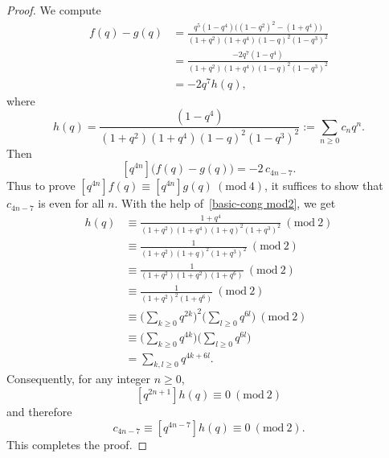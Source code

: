 \documentclass[10pt,a4paper]{amsart}
\newcommand{\Mod}[1]{\ (\mathrm{mod}\ #1)}
\newcommand{\fr}{\frac}
\begin{document}
\begin{proof}
We compute
\[
\begin{aligned}
f(q)-g(q)
&=\frac{q^5(1-q^4)\bigl((1-q^2)^2-(1+q^4)\bigr)}
        {(1+q^2)(1+q^4)(1-q)^2(1-q^3)^2} \\
&=\frac{-2q^7(1-q^4)}{(1+q^2)(1+q^4)(1-q)^2(1-q^3)^2} \\
&=-2q^7 h(q),
\end{aligned}
\]
where
\[
h(q)=\fr{(1-q^4)}{(1+q^2)(1+q^4)(1-q)^2(1-q^3)^2} := \sum_{n\ge0} c_n q^n.
\]
Then
\[
[q^{4n}]\big( f(q)-g(q) \big)=-2\,c_{4n-7}.
\]
Thus to prove $[q^{4n}]f(q)\equiv [q^{4n}]g(q)\Mod{4}$, it suffices to show that
$c_{4n-7}$ is even for all $n$.
With the help of~\eqref{basic-cong mod2}, we get
\begin{align*}
h(q) &\equiv \frac{1+q^4}{(1+q^2)(1+q^4)(1+q)^2(1+q^3)^2} \Mod{2} \\
&\equiv \frac{1}{(1+q^2)(1+q)^2(1+q^3)^2}\Mod{2} \\
&\equiv \frac{1}{(1+q^2)(1+q^2)(1+q^6)} \Mod{2}\\
&\equiv \frac{1}{(1+q^2)^2(1+q^6)}\Mod{2} \\
&\equiv \Big(\sum_{k\ge0} q^{2k}\Big)^2 \Big(\sum_{l\ge0} q^{6l}\Big) \Mod{2} \\
&\equiv \Big(\sum_{k\ge0} q^{4k}\Big)\Big(\sum_{l\ge0} q^{6l}\Big) \\
&=\sum_{k,l\geq 0} q^{4k+6l}.
\end{align*}
%
Consequently, for any integer $n\geq 0$,
\[
[q^{2n+1}]h(q)\equiv 0 \Mod{2}
\]
and therefore
\[
c_{4n-7} \equiv [q^{4n-7}]h(q)\equiv 0\Mod{2}.
\]
This completes the proof.
\end{proof}
\end{document}
